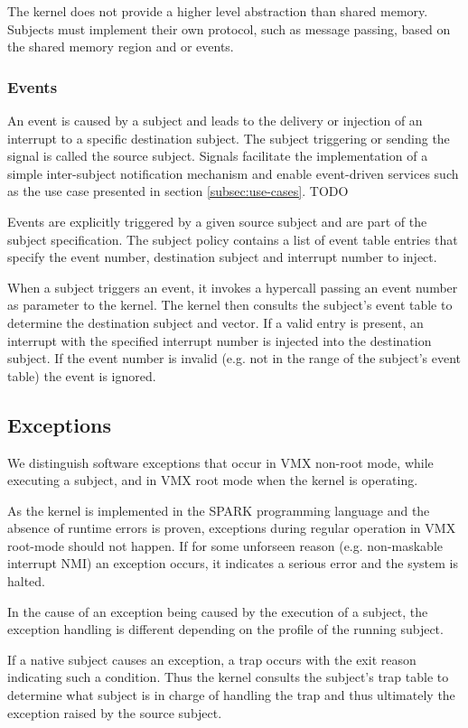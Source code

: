 The kernel does not provide a higher level abstraction than shared memory.
Subjects must implement their own protocol, such as message passing, based on
the shared memory region and or events.

\subsubsection{Events}
An event is caused by a subject and leads to the delivery or injection of an
interrupt to a specific destination subject. The subject triggering or sending
the signal is called the source subject. Signals facilitate the implementation
of a simple inter-subject notification mechanism and enable event-driven
services such as the use case presented in section \ref{subsec:use-cases}. TODO

Events are explicitly triggered by a given source subject and are part of the
subject specification. The subject policy contains a list of event table entries
that specify the event number, destination subject and interrupt number to
inject.

When a subject triggers an event, it invokes a hypercall passing an event number
as parameter to the kernel. The kernel then consults the subject's event table
to determine the destination subject and vector. If a valid entry is present, an
interrupt with the specified interrupt number is injected into the destination
subject. If the event number is invalid (e.g. not in the range of the subject's
event table) the event is ignored.

\subsection{Exceptions}
We distinguish software exceptions that occur in VMX non-root mode, while
executing a subject, and in VMX root mode when the kernel is operating.

As the kernel is implemented in the SPARK programming language and the absence
of runtime errors is proven, exceptions during regular operation in VMX
root-mode should not happen. If for some unforseen reason (e.g. non-maskable
interrupt NMI) an exception occurs, it indicates a serious error and the system
is halted.

In the cause of an exception being caused by the execution of a subject, the
exception handling is different depending on the profile of the running subject.

If a native subject causes an exception, a trap occurs with the exit reason
indicating such a condition. Thus the kernel consults the subject's trap table
to determine what subject is in charge of handling the trap and thus ultimately
the exception raised by the source subject.

